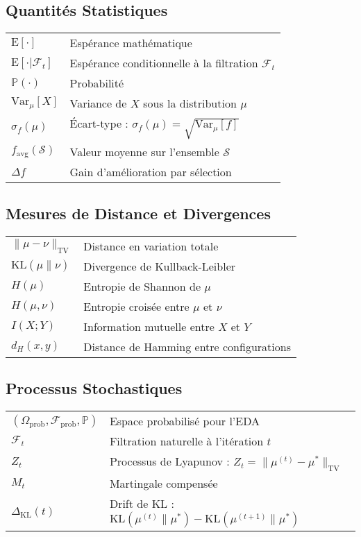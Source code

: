 \documentclass[12pt,a4paper]{article}
\theoremstyle{definition}
\theoremstyle{remark}
\newcommand{\E}{\text{E}}
\newcommand{\Prob}{\mathbb{P}}
\newcommand{\Var}{\text{Var}}
\newcommand{\KL}{\text{KL}}
\newcommand{\TV}{\text{TV}}
\begin{document}
	\subsection*{Quantités Statistiques}
	
	\begin{tabular}{ll}
		$\E[\cdot]$ & Espérance mathématique \\
		$\E[\cdot | \mathcal{F}_t]$ & Espérance conditionnelle à la filtration $\mathcal{F}_t$ \\
		$\Prob(\cdot)$ & Probabilité \\
		$\Var_\mu[X]$ & Variance de $X$ sous la distribution $\mu$ \\
		$\sigma_f(\mu)$ & Écart-type : $\sigma_f(\mu) = \sqrt{\Var_\mu[f]}$ \\
		$f_{\text{avg}}(\mathcal{S})$ & Valeur moyenne sur l'ensemble $\mathcal{S}$ \\
		$\Delta f$ & Gain d'amélioration par sélection \\
	\end{tabular}
	
	\subsection*{Mesures de Distance et Divergences}
	
	\begin{tabular}{ll}
		$\|\mu - \nu\|_{\TV}$ & Distance en variation totale \\
		$\KL(\mu \| \nu)$ & Divergence de Kullback-Leibler \\
		$H(\mu)$ & Entropie de Shannon de $\mu$ \\
		$H(\mu, \nu)$ & Entropie croisée entre $\mu$ et $\nu$ \\
		$I(X; Y)$ & Information mutuelle entre $X$ et $Y$ \\
		$d_H(x, y)$ & Distance de Hamming entre configurations \\
	\end{tabular}
	
	\subsection*{Processus Stochastiques}
	
	\begin{tabular}{ll}
		$(\Omega_{\text{prob}}, \mathcal{F}_{\text{prob}}, \Prob)$ & Espace probabilisé pour l'EDA \\
		$\mathcal{F}_t$ & Filtration naturelle à l'itération $t$ \\
		$Z_t$ & Processus de Lyapunov : $Z_t = \|\mu^{(t)} - \mu^*\|_{\TV}$ \\
		$M_t$ & Martingale compensée \\
		$\Delta_{\KL}(t)$ & Drift de KL : $\KL(\mu^{(t)} \| \mu^*) - \KL(\mu^{(t+1)} \| \mu^*)$ \\
	\end{tabular}
	
\end{document}
